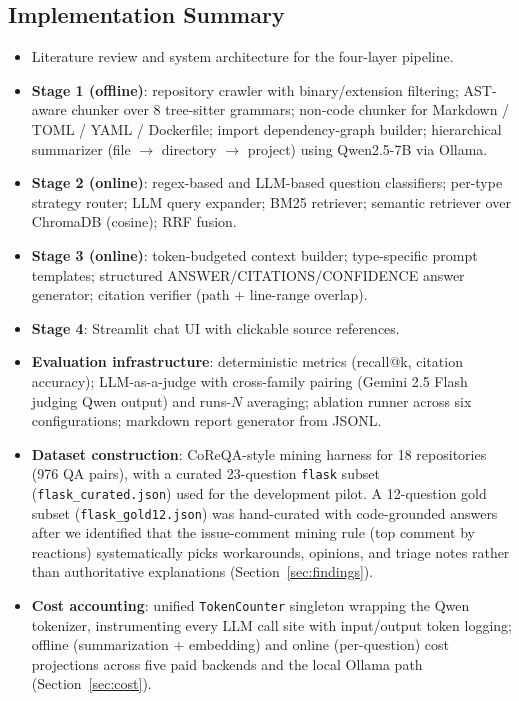 \documentclass[11pt]{article}
\begin{document}
\subsection{Implementation Summary}
\begin{itemize}
    \item Literature review and system architecture for the four-layer pipeline.
    \item \textbf{Stage 1 (offline)}: repository crawler with binary/extension filtering; AST-aware chunker over 8 tree-sitter grammars; non-code chunker for Markdown / TOML / YAML / Dockerfile; import dependency-graph builder; hierarchical summarizer (file $\rightarrow$ directory $\rightarrow$ project) using Qwen2.5-7B via Ollama.
    \item \textbf{Stage 2 (online)}: regex-based and LLM-based question classifiers; per-type strategy router; LLM query expander; BM25 retriever; semantic retriever over ChromaDB (cosine); RRF fusion.
    \item \textbf{Stage 3 (online)}: token-budgeted context builder; type-specific prompt templates; structured ANSWER/CITATIONS/CONFIDENCE answer generator; citation verifier (path + line-range overlap).
    \item \textbf{Stage 4}: Streamlit chat UI with clickable source references.
    \item \textbf{Evaluation infrastructure}: deterministic metrics (recall@k, citation accuracy); LLM-as-a-judge with cross-family pairing (Gemini 2.5 Flash judging Qwen output) and runs-$N$ averaging; ablation runner across six configurations; markdown report generator from JSONL.
    \item \textbf{Dataset construction}: CoReQA-style mining harness for 18 repositories (976 QA pairs), with a curated 23-question \texttt{flask} subset (\texttt{flask\_curated.json}) used for the development pilot. A 12-question gold subset (\texttt{flask\_gold12.json}) was hand-curated with code-grounded answers after we identified that the issue-comment mining rule (top comment by reactions) systematically picks workarounds, opinions, and triage notes rather than authoritative explanations (Section~\ref{sec:findings}).
    \item \textbf{Cost accounting}: unified \texttt{TokenCounter} singleton wrapping the Qwen tokenizer, instrumenting every LLM call site with input/output token logging; offline (summarization + embedding) and online (per-question) cost projections across five paid backends and the local Ollama path (Section~\ref{sec:cost}).

\end{itemize}
\end{document}
